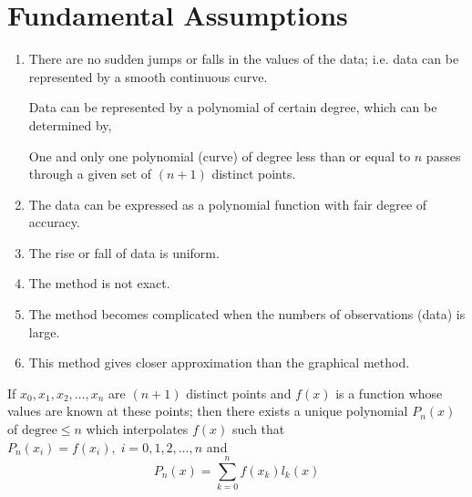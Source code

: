 \documentclass[12pt,class=book,crop=false]{standalone}
\begin{document}
\section{Fundamental Assumptions}
\begin{enumerate}
    \item There are no sudden jumps or falls in the values of the data; i.e. data can be represented by a smooth continuous curve.

          Data can be represented by a polynomial of certain degree, which can be determined by,
          \begin{thm}
              One and only one polynomial (curve) of degree less than or equal to \(  n \) passes through a given set of \(  (n+1) \) distinct points.
          \end{thm}
    \item The data can be expressed as a polynomial function with fair degree of accuracy.
    \item The rise or fall of data is uniform.
    \item The method is not exact.
    \item The method becomes complicated when the numbers of observations (data) is large.
    \item This method gives closer approximation than the graphical method.
\end{enumerate}
\begin{thm}
    If \(  x_0,x_1,x_2,\dots,x_n \) are \(  (n+1) \) distinct points and \(  f(x) \) is a function whose values are known at these points; then there exists a unique polynomial \(  P_n(x) \) of \( \text{degree}  \leq n \) which interpolates \(  f(x) \) such that \(  P_n(x_i)=f(x_i),\; i=0,1,2,\dots ,n \) and
    \[P_n(x)=\sum_{k=0}^n f(x_k)l_k(x)\]
\end{thm}
\end{document}

